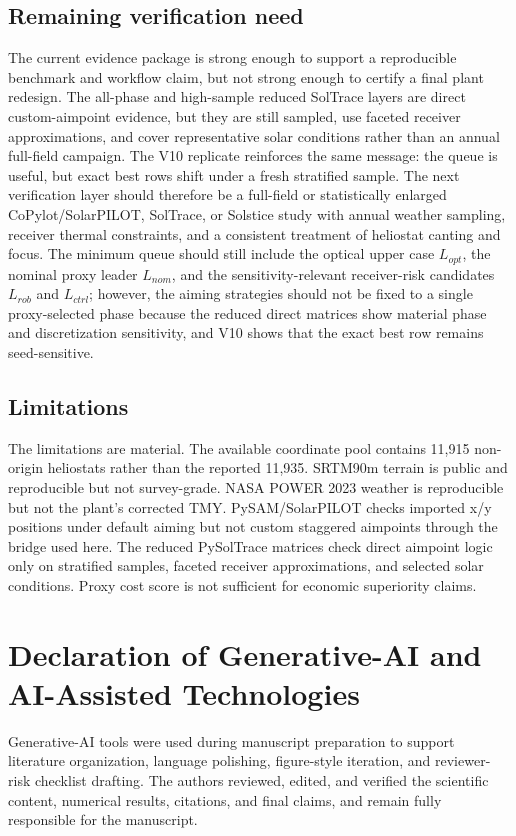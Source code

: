 \documentclass[final,3p,times]{elsarticle}
\begin{document}
\subsection{Remaining verification need}
The current evidence package is strong enough to support a reproducible benchmark and workflow claim, but not strong enough to certify a final plant redesign. The all-phase and high-sample reduced SolTrace layers are direct custom-aimpoint evidence, but they are still sampled, use faceted receiver approximations, and cover representative solar conditions rather than an annual full-field campaign. The V10 replicate reinforces the same message: the queue is useful, but exact best rows shift under a fresh stratified sample. The next verification layer should therefore be a full-field or statistically enlarged CoPylot/SolarPILOT, SolTrace, or Solstice study with annual weather sampling, receiver thermal constraints, and a consistent treatment of heliostat canting and focus. The minimum queue should still include the optical upper case $L_{opt}$, the nominal proxy leader $L_{nom}$, and the sensitivity-relevant receiver-risk candidates $L_{rob}$ and $L_{ctrl}$; however, the aiming strategies should not be fixed to a single proxy-selected phase because the reduced direct matrices show material phase and discretization sensitivity, and V10 shows that the exact best row remains seed-sensitive.

\subsection{Limitations}
The limitations are material. The available coordinate pool contains 11,915 non-origin heliostats rather than the reported 11,935. SRTM90m terrain is public and reproducible but not survey-grade. NASA POWER 2023 weather is reproducible but not the plant's corrected TMY. PySAM/SolarPILOT checks imported x/y positions under default aiming but not custom staggered aimpoints through the bridge used here. The reduced PySolTrace matrices check direct aimpoint logic only on stratified samples, faceted receiver approximations, and selected solar conditions. Proxy cost score is not sufficient for economic superiority claims.

\section{Declaration of Generative-AI and AI-Assisted Technologies}
Generative-AI tools were used during manuscript preparation to support literature organization, language polishing, figure-style iteration, and reviewer-risk checklist drafting. The authors reviewed, edited, and verified the scientific content, numerical results, citations, and final claims, and remain fully responsible for the manuscript.
\end{document}
